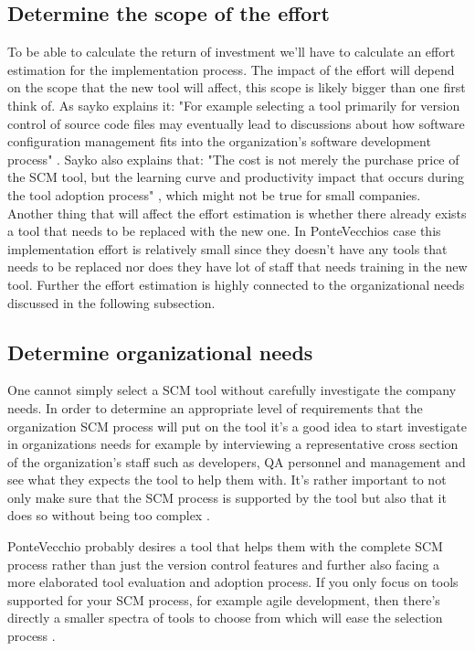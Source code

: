 \documentclass[10pt]{article}
\begin{document}
\subsection{Determine the scope of the effort}
To be able to calculate the return of investment we'll have to calculate an effort estimation for the implementation process. The impact of the effort will depend on the scope that the new tool will affect, this scope is likely bigger than one first think of. As sayko explains it: "For example selecting a tool primarily for version control of source code files may eventually lead to discussions about how software configuration management fits into the organization's software development process" \cite{Sayko}. Sayko also explains that: "The cost is not merely the purchase price of the SCM tool, but the learning curve and productivity impact that occurs during the tool adoption process" \cite{Sayko}, which might not be true for small companies. Another thing that will affect the effort estimation is whether there already exists a tool that needs to be replaced with the new one. In PonteVecchios case this implementation effort is relatively small since they doesn't have any tools that needs to be replaced nor does they have lot of staff that needs training in the new tool. Further the effort estimation is highly connected to the organizational needs discussed in the following subsection.

\subsection{Determine organizational needs}
One cannot simply select a SCM tool without carefully investigate the company needs.
In order to determine an appropriate level of requirements that the organization SCM process will put on the tool it's a good idea to start investigate in organizations needs for example by interviewing a representative cross section of the organization's staff such as developers, QA personnel and management and see what they expects the tool to help them with.
It's rather important to not only make sure that the SCM process is supported by the tool but also that it does so without being too complex \cite{ABB}.

PonteVecchio probably desires a tool that helps them with the complete SCM process rather than just the version control features and further also facing a more elaborated tool evaluation and adoption process. If you only focus on tools supported for your SCM process, for example agile development, then there's directly a smaller spectra of tools to choose from which will ease the selection process \cite{Sayko}.
\end{document}
